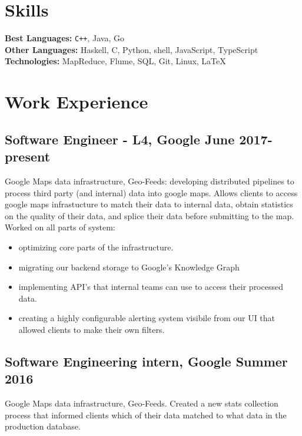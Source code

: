 \documentclass[5pt]{resume}
\begin{document}


{\color{titleColor}\section{Skills}}
\noindent\textbf{Best Languages:} {\color{default} \verb!C++!, Java, Go }\\
\textbf{Other Languages:} {\color{default} Haskell, C, Python, shell, JavaScript, TypeScript} \\
\textbf{Technologies:} {\color{default} MapReduce, Flume, SQL, Git, Linux, \LaTeX } 

{\color{titleColor} \section{Work Experience}}

\subsection{\textbf{Software Engineer - L4, Google \hfill June 2017-present}}
{\color{default} Google Maps data infrastructure, Geo-Feeds: developing 
  distributed pipelines to process third party (and internal) data into google 
  maps. Allows clients to access google maps infrastucture to match their data 
  to internal data, obtain statistics on the quality of their data, and splice
  their data before submitting to the map.
  Worked on all parts of system:
  \begin{itemize}
	\itemsep0em 
  	\item optimizing core parts of the infrastructure.
	\item migrating our backend storage to Google's Knowledge Graph
	\item implementing API's that internal teams can use to access their processed data.
  	\item creating a highly configurable alerting system visibile from our UI that allowed clients to make their own filters.
\end{itemize}
}

\subsection{\textbf{Software Engineering intern, Google \hfill Summer 2016}}
{\color{default} Google Maps data infrastructure, Geo-Feeds. Created a new stats collection process that informed clients which of their data matched to what data in the production database.}
\end{document}
